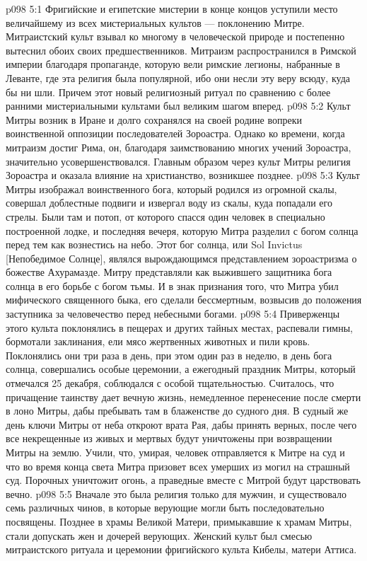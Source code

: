 \vs p098 5:1 Фригийские и египетские мистерии в конце концов уступили место величайшему из всех мистериальных культов --- поклонению Митре. Митраистский культ взывал ко многому в человеческой природе и постепенно вытеснил обоих своих предшественников. Митраизм распространился в Римской империи благодаря пропаганде, которую вели римские легионы, набранные в Леванте, где эта религия была популярной, ибо они несли эту веру всюду, куда бы ни шли. Причем этот новый религиозный ритуал по сравнению с более ранними мистериальными культами был великим шагом вперед.
\vs p098 5:2 Культ Митры возник в Иране и долго сохранялся на своей родине вопреки воинственной оппозиции последователей Зороастра. Однако ко времени, когда митраизм достиг Рима, он, благодаря заимствованию многих учений Зороастра, значительно усовершенствовался. Главным образом через культ Митры религия Зороастра и оказала влияние на христианство, возникшее позднее.
\vs p098 5:3 \pc Культ Митры изображал воинственного бога, который родился из огромной скалы, совершал доблестные подвиги и извергал воду из скалы, куда попадали его стрелы. Были там и потоп, от которого спасся один человек в специально построенной лодке, и последняя вечеря, которую Митра разделил с богом солнца перед тем как вознестись на небо. Этот бог солнца, или Sol Invictus [Непобедимое Солнце], являлся вырождающимся представлением зороастризма о божестве Ахурамазде. Митру представляли как выжившего защитника бога солнца в его борьбе с богом тьмы. И в знак признания того, что Митра убил мифического священного быка, его сделали бессмертным, возвысив до положения заступника за человечество перед небесными богами.
\vs p098 5:4 Приверженцы этого культа поклонялись в пещерах и других тайных местах, распевали гимны, бормотали заклинания, ели мясо жертвенных животных и пили кровь. Поклонялись они три раза в день, при этом один раз в неделю, в день бога солнца, совершались особые церемонии, а ежегодный праздник Митры, который отмечался 25 декабря, соблюдался с особой тщательностью. Считалось, что причащение таинству дает вечную жизнь, немедленное перенесение после смерти в лоно Митры, дабы пребывать там в блаженстве до судного дня. В судный же день ключи Митры от неба откроют врата Рая, дабы принять верных, после чего все некрещенные из живых и мертвых будут уничтожены при возвращении Митры на землю. Учили, что, умирая, человек отправляется к Митре на суд и что во время конца света Митра призовет всех умерших из могил на страшный суд. Порочных уничтожит огонь, а праведные вместе с Митрой будут царствовать вечно.
\vs p098 5:5 Вначале это была религия только для мужчин, и существовало семь различных чинов, в которые верующие могли быть последовательно посвящены. Позднее в храмы Великой Матери, примыкавшие к храмам Митры, стали допускать жен и дочерей верующих. Женский культ был смесью митраистского ритуала и церемонии фригийского культа Кибелы, матери Аттиса.
